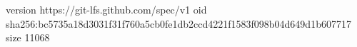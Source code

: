 version https://git-lfs.github.com/spec/v1
oid sha256:bc5735a18d3031f31f760a5cb0fe1db2ccd4221f1583f098b04d649d1b607717
size 11068

